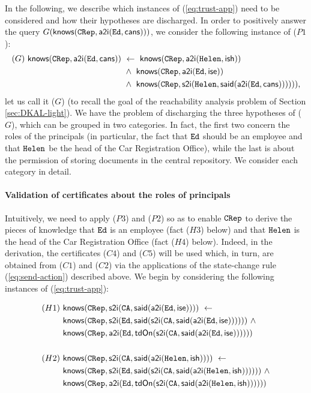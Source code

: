 \documentclass[conference]{llncs}
\newcommand{\theCA}{\ensuremath \mathtt{CA}}
\newcommand{\Ed}{\ensuremath \mathtt{Ed}}
\newcommand{\Helen}{\ensuremath \mathtt{Helen}}
\newcommand{\CRep}{\ensuremath \mathtt{CRep}}
\newcommand{\canstoredoc}{\ensuremath \mathsf{cans}}
\newcommand{\ishead}{\ensuremath \mathsf{ish}}
\newcommand{\isemployee}{\ensuremath \mathsf{ise}}
\newcommand{\know}{\ensuremath \mathsf{knows}}
\newcommand{\atoi}{\ensuremath \mathsf{a2i}}
\newcommand{\stoi}{\ensuremath \mathsf{s2i}}
\newcommand{\said}{\ensuremath \mathsf{said}}
\newcommand{\tdOn}{\ensuremath \mathsf{tdOn}}
\begin{document}
{In the
following, we describe which instances of (\ref{eq:trust-app}) need to
be considered and how their hypotheses are discharged.
In order to positively answer the query $G(\know(\CRep,
\atoi(\Ed, \canstoredoc)))$, we consider the following
instance of ($P1$): 
\begin{align*}
  (G) ~ \know(\CRep,\atoi(\Ed, \canstoredoc)) ~ &\leftarrow ~ \know(\CRep, \atoi(\Helen, \ishead)) \\
& \wedge ~ \know(\CRep, \atoi(\Ed, \isemployee)) \\
 &\wedge ~\know (\CRep, \stoi(\Helen,\said(\atoi(\Ed, \canstoredoc))) )))  ,
\end{align*}
let us call it ($G$) (to recall the goal of the reachability analysis problem of Section \ref{sec:DKAL-light}).  We have the problem of discharging the three hypotheses of ($G$), which can be grouped in two categories.  In fact,
the first two concern the roles of the principals (in particular, the
fact that $\Ed$ should be an employee and that $\Helen$ be the head of
the Car Registration Office), while the last is about the permission of
storing documents in the central repository.  We consider each
category in detail.  \\


\paragraph{Validation of certificates about the roles of principals}

Intuitively, we need to apply ($P3$) and ($P2$) so as to enable $\CRep$ to
derive the pieces of knowledge that $\Ed$ is an employee (fact ($H3$)
below) and that $\Helen$ is the head of the Car Registration Office
(fact ($H4$) below). Indeed, in the derivation, the certificates ($C4$) and
($C5$) will be used which, in turn, are obtained from ($C1$) and ($C2$) via
the applications of the state-change rule (\ref{eq:send-action})
described above. We begin by considering the following instances of
(\ref{eq:trust-app}):

\begin{small}
\begin{align*}
     (H1)~ & \know(\CRep,\stoi(\theCA, \said(\atoi(\Ed, \isemployee)))) ~ \leftarrow  \\
    & \know(\CRep,\stoi(\Ed,\said(\stoi(\theCA, \said(\atoi(\Ed, \isemployee)))))) ~ \wedge ~\\
    & \know(\CRep,\atoi(\Ed,\tdOn(\stoi(\theCA, \said(\atoi(\Ed, \isemployee))))))  \\
     & \\
    (H2)~ & \know(\CRep,\stoi(\theCA, \said(\atoi(\Helen, \ishead)))) ~ \leftarrow  \\
    & \know(\CRep,\stoi(\Ed,\said(\stoi(\theCA, \said(\atoi(\Helen, \ishead)))))) ~ \wedge \\
    & \know(\CRep,\atoi(\Ed,\tdOn(\stoi(\theCA, \said(\atoi(\Helen, \ishead))))))
\end{align*}
\end{small}

}
\end{document}
